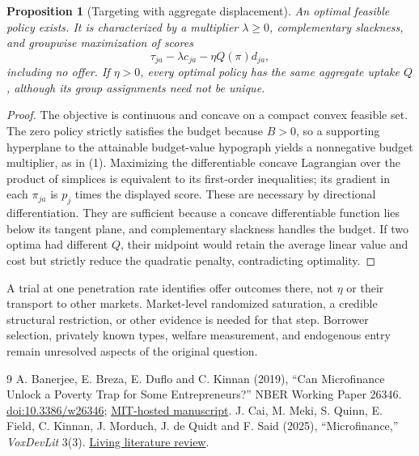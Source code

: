 \documentclass[11pt,a4paper]{article}
\newtheorem{proposition}[theorem]{Proposition}
\theoremstyle{remark}
\begin{document}
\begin{proposition}[Targeting with aggregate displacement]
An optimal feasible policy exists. It is characterized by a multiplier $\lambda\ge0$, complementary slackness, and groupwise maximization of scores
\[
 \tau_{ja}-\lambda c_{ja}-\eta Q(\pi)d_{ja},
\]
including no offer. If $\eta>0$, every optimal policy has the same aggregate uptake $Q$, although its group assignments need not be unique.
\end{proposition}
\begin{proof}
The objective is continuous and concave on a compact convex feasible set. The zero policy strictly satisfies the budget because $B>0$, so a supporting hyperplane to the attainable budget-value hypograph yields a nonnegative budget multiplier, as in (1). Maximizing the differentiable concave Lagrangian over the product of simplices is equivalent to its first-order inequalities; its gradient in each $\pi_{ja}$ is $p_j$ times the displayed score. These are necessary by directional differentiation. They are sufficient because a concave differentiable function lies below its tangent plane, and complementary slackness handles the budget. If two optima had different $Q$, their midpoint would retain the average linear value and cost but strictly reduce the quadratic penalty, contradicting optimality.
\end{proof}
A trial at one penetration rate identifies offer outcomes there, not $\eta$ or their transport to other markets. Market-level randomized saturation, a credible structural restriction, or other evidence is needed for that step. Borrower selection, privately known types, welfare measurement, and endogenous entry remain unresolved aspects of the original question.

\begin{thebibliography}{9}
 A. Banerjee, E. Breza, E. Duflo and C. Kinnan (2019), ``Can Microfinance Unlock a Poverty Trap for Some Entrepreneurs?'' NBER Working Paper 26346. \href{https://doi.org/10.3386/w26346}{doi:10.3386/w26346}; \href{https://economics.mit.edu/sites/default/files/publications/w26346.pdf}{MIT-hosted manuscript}.
 J. Cai, M. Meki, S. Quinn, E. Field, C. Kinnan, J. Morduch, J. de Quidt and F. Said (2025), ``Microfinance,'' \emph{VoxDevLit} 3(3). \href{https://voxdev.org/voxdevlit/microfinance}{Living literature review}.
\end{thebibliography}
\end{document}
